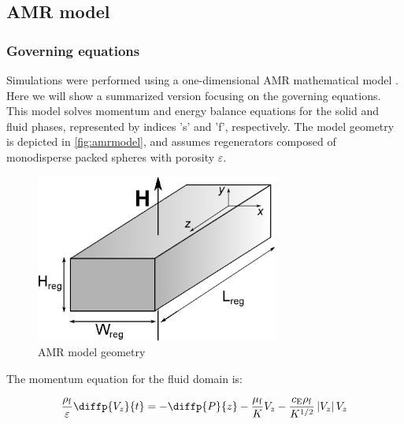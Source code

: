 \documentclass[draft]{svjour3}
\begin{document}
\subsection{AMR model}
\label{sec:amr-model}

\subsubsection{Governing equations}
\label{sec:governing-equations}

Simulations were performed using a one-dimensional AMR mathematical model \cite{bib:asme-mce,bib:trevizoli16_perfor_model}. Here we will show a summarized version focusing on the governing equations. This model solves momentum and energy balance equations for the solid and fluid phases, represented by indices 's' and 'f', respectively. The model geometry is depicted in \autoref{fig:amrmodel}, and assumes regenerators composed of monodisperse packed spheres with porosity $\varepsilon$.


\begin{figure}[!ht]
  \centering
  \includegraphics[width=8cm]{reg3d}
  \caption{AMR model geometry}
  \label{fig:amrmodel}
\end{figure}

The momentum equation for the fluid domain is:

\begin{equation}
\label{eq:75}
  \frac{\rho\ped{f}}{\varepsilon} \diffp{V_z}{t}= -\diffp{P}{z} - \frac{\mu\ped{f}}{K} V_z - \frac{c\ped{E} \rho\ped{f}}{K^{1/2}} \left| V_z\right| V_z 
\end{equation}

\end{document}
